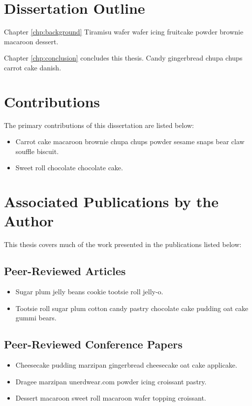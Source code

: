 \section{Dissertation Outline}
\label{sec:outline}
\begin{description}
\item Chapter \ref{chp:background} Tiramisu wafer wafer icing fruitcake powder brownie macaroon dessert. 

\item Chapter \ref{chp:conclusion} concludes this thesis. Candy gingerbread chupa chups carrot cake danish. 
\end{description}

\section{Contributions}
The primary contributions of this dissertation are listed below:

\begin{itemize}
  \onehalfspacing
\item Carrot cake macaroon brownie chupa chups powder sesame snaps bear claw souffle biscuit. 
\item Sweet roll chocolate chocolate cake. 
\end{itemize}

\section{Associated Publications by the Author}

This thesis covers much of the work presented in the publications listed below:

\subsection{Peer-Reviewed Articles}
\renewcommand{\thefootnote}{\fnsymbol{footnote}}
\vspace{1em}
\begin{itemize}
\onehalfspacing
\item Sugar plum jelly beans cookie tootsie roll jelly-o.
\item Tootsie roll sugar plum cotton candy pastry chocolate cake pudding oat cake gummi bears. 
\end{itemize}

\subsection{Peer-Reviewed Conference Papers}
\vspace{1em}
\begin{itemize}
\onehalfspacing
\item Cheesecake pudding marzipan gingerbread cheesecake oat cake applicake.
\item  Dragee marzipan unerdwear.com powder icing croissant pastry. 
\item  Dessert macaroon sweet roll macaroon wafer topping croissant. 

\end{itemize}

